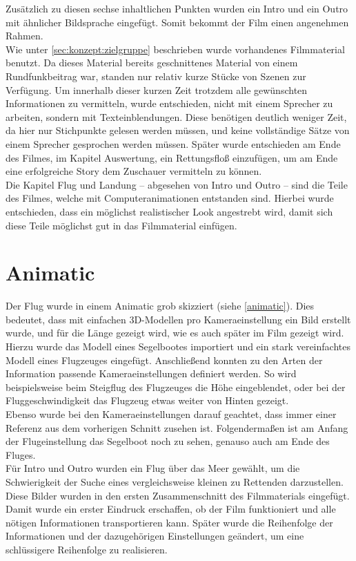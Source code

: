 Zusätzlich zu diesen sechse inhaltlichen Punkten wurden ein Intro und ein Outro mit ähnlicher Bildsprache eingefügt. Somit bekommt der Film einen angenehmen Rahmen.\\
Wie unter \autoref{sec:konzept:zielgruppe} beschrieben wurde vorhandenes Filmmaterial benutzt. Da dieses Material bereits geschnittenes Material von einem Rundfunkbeitrag war, standen nur relativ kurze Stücke von Szenen zur Verfügung. Um innerhalb dieser kurzen Zeit trotzdem alle gewünschten Informationen zu vermitteln, wurde entschieden, nicht mit einem Sprecher zu arbeiten, sondern mit Texteinblendungen. Diese benötigen deutlich weniger Zeit, da hier nur Stichpunkte gelesen werden müssen, und keine vollständige Sätze von einem Sprecher gesprochen werden müssen.
Später wurde entschieden am Ende des Filmes, im Kapitel Auswertung, ein Rettungsfloß einzufügen, um am Ende eine erfolgreiche Story dem Zuschauer vermitteln zu können.\\
Die Kapitel Flug und Landung -- abgesehen von Intro und Outro -- sind die Teile des Filmes, welche mit Computeranimationen entstanden sind. Hierbei wurde entschieden, dass ein möglichst realistischer Look angestrebt wird, damit sich diese Teile möglichst gut in das Filmmaterial einfügen.

\section{Animatic} %
\label{sec:konzept:animatic}

Der Flug wurde in einem Animatic grob skizziert (siehe \autoref{animatic}). Dies bedeutet, dass mit einfachen 3D-Modellen pro Kameraeinstellung ein Bild erstellt wurde, und für die Länge gezeigt wird, wie es auch später im Film gezeigt wird. Hierzu wurde das Modell eines Segelbootes importiert und ein stark vereinfachtes Modell eines Flugzeuges eingefügt. Anschließend konnten zu den Arten der Information passende Kameraeinstellungen definiert werden. So wird beispielsweise beim Steigflug des Flugzeuges die Höhe eingeblendet, oder bei der Fluggeschwindigkeit das Flugzeug etwas weiter von Hinten gezeigt. \\
Ebenso wurde bei den Kameraeinstellungen darauf geachtet, dass immer einer Referenz aus dem vorherigen Schnitt zusehen ist. Folgendermaßen ist am Anfang der Flugeinstellung das Segelboot noch zu sehen, genauso auch am Ende des Fluges.\\
Für Intro und Outro wurden ein Flug über das Meer gewählt, um die Schwierigkeit der Suche eines vergleichsweise kleinen zu Rettenden darzustellen.
Diese Bilder wurden in den ersten Zusammenschnitt des Filmmaterials eingefügt. Damit wurde ein erster Eindruck erschaffen, ob der Film funktioniert und alle nötigen Informationen transportieren kann. Später wurde die Reihenfolge der Informationen und der dazugehörigen Einstellungen geändert, um eine schlüssigere Reihenfolge zu realisieren.



